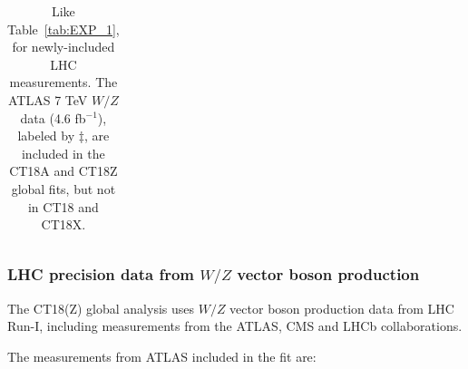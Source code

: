 \begin{widetext}
\begin{table}[tb]
\begin{tabular}{|l|lr|c|c|c|c|}
 \hline
\end{tabular}
\caption{Like Table~\ref{tab:EXP_1}, for newly-included LHC measurements.
	The ATLAS 7 TeV $W/Z$ data (4.6 fb$^{-1}$), labeled by $\ddagger$, are included in the CT18A and CT18Z global fits, but not in CT18 and CT18X. 
\label{tab:EXP_2} }
\end{table}
\endgroup
\end{widetext}



\subsubsection{LHC precision data from $W/Z$ vector boson production
\label{sec:DataWZ}
}


The CT18(Z) global analysis uses $W/Z$ vector boson production data from LHC Run-I, including measurements from the ATLAS, CMS and LHCb collaborations. 
%

The measurements from ATLAS included in the fit are: 

